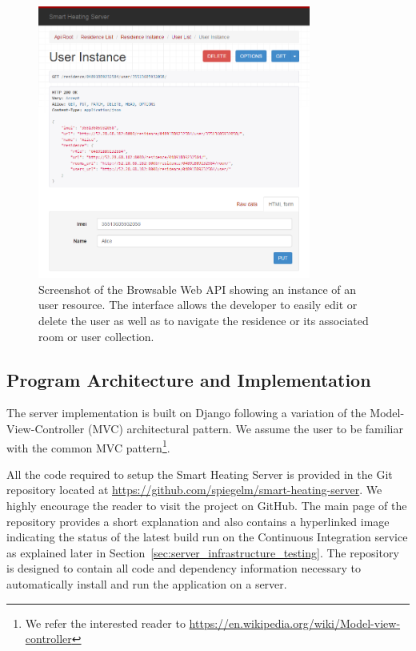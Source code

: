 \begin{figure}[h]
	\begin{center}
		\includegraphics[width=0.8\textwidth]{images/server_browable_api_user_instance.png}
	\end{center}
	\caption{Screenshot of the Browsable Web API showing an instance of an user resource. The interface allows the developer to easily edit or delete the user as well as to navigate the residence or its associated room or user collection.}
	\label{fig:server_infrastructure_browsable_api}
\end{figure}


\subsection{Program Architecture and Implementation}

The server implementation is built on Django following a variation
of the Model-View-Controller (MVC) architectural pattern.
We assume the user to be familiar with the common MVC pattern\footnote{We refer the interested reader to \url{https://en.wikipedia.org/wiki/Model-view-controller}}.

All the code required to setup the Smart Heating Server is provided in the Git repository located at \url{https://github.com/spiegelm/smart-heating-server}.
We highly encourage the reader to visit the project on GitHub.
The main page of the repository provides a short explanation and also contains a hyperlinked image indicating the status of the latest build run on the Continuous Integration service as explained later in Section~\ref{sec:server_infrastructure_testing}.
The repository is designed to contain all code and dependency information necessary to automatically install and run the application on a server.

